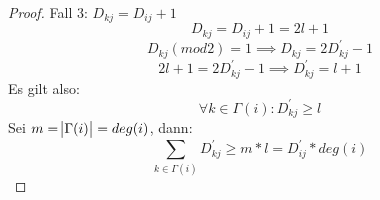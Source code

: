 \documentclass{article}
\begin{document}
\begin{proof}
Fall 3: $D_{kj} = D_{ij}+1$
\begin{equation}
D_{kj} = D_{ij}+1=2l+1
\end{equation}
\begin{equation}
D_{kj}(mod2) = 1 \implies D_{kj}=2D^{'}_{kj}-1
\end{equation}
\begin{equation}
2l+1 = 2D^{'}_{kj}-1 \implies D^{'}_{kj}=l+1
\end{equation}
Es gilt also:
\begin{equation}
\forall k \in \Gamma(i): D^{'}_{kj} \geq l
\end{equation}
Sei $m=\abs{\Gamma(i)}=deg(i)$, dann:
\begin{equation}
\sum_{k \in \Gamma(i)} D^{'}_{kj} \geq m*l = D^{'}_{ij} * deg(i)  
\end{equation}
\end{proof}
\end{document}
